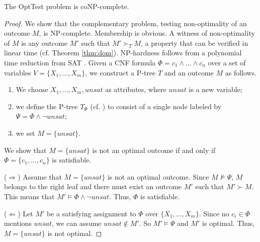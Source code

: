 \begin{thm}
\label{thm:opt_test}
	The {\sc OptTest} problem is coNP-complete.
\end{thm}
\begin{proof}
%
We show that the complementary problem, testing non-optimality of an outcome
$M$, is NP-complete. Membership is obvious. A witness of non-optimality of $M$
is any outcome $M'$ such that $M' \succ_T M$, a property that can be verified 
in linear time (cf. Theorem \ref{thm:dom}).
	NP-hardness follows from a polynomial time reduction from SAT \cite{Garey:1979}.
	Given a CNF formula $\Phi=c_1\land\ldots\land c_n$ over a set of variables
	$V=\{X_1,\ldots,X_m\}$, we construct a P-tree $T$ and an outcome $M$
as follows.
\begin{enumerate}
\item We choose $X_1,\ldots,X_m,unsat$ as attributes, where $unsat$ is 
a new variable;
\item we define the P-tree $T_\Phi$ (cf. ) to consist of a 
single node labeled by $\Psi=\Phi \land \neg unsat$;
\item we set $M=\{unsat\}$.
\end{enumerate}

	We show that $M=\{unsat\}$ is not an optimal outcome if and only if
	$\Phi=\{c_1,\ldots,c_n\}$ is satisfiable.

\noindent
	($\Rightarrow$) Assume that $M=\{unsat\}$ is not an optimal outcome.
	Since $M \not \models \Psi$, $M$ belongs to the right
	leaf and there must exist an outcome $M'$ such that $M' \succ M$.
	This means that $M' \models \Phi \wedge \neg unsat$. Thus, 
	$\Phi$ is satisfiable.

\noindent
	($\Leftarrow$) Let $M'$ be a satisfying assignment to $\Phi$ over $\{X_1,\ldots,X_m\}$.
	Since no $c_i \in \Phi$ mentions $unsat$, we can assume $unsat \not \in M'$.
	So $M' \models \Psi$ and $M'$ is optimal.
	Thus, $M=\{unsat\}$ is not optimal.
\end{proof}

